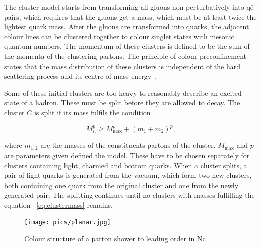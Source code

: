 The cluster model starts from transforming all gluons non-perturbatively into $\mathrm{q \bar q}$ pairs, which requires that the gluons get a mass, which must be at least twice the lightest quark mass. After the gluons are transformed into quarks, the adjacent colour lines can be clustered together to colour singlet states with mesonic quantum numbers. The momentum of these clusters is defined to be the sum of the momenta of the clustering partons. The principle of colour-preconfinement states that the mass distribution of these clusters is independent of the hard scattering process and its centre-of-mass energy~\cite{herwigManual}. %

Some of these initial clusters are too heavy to reasonably describe an excited state of a hadron. These must be
split before they are allowed to decay. The cluster $C$ is split if its mass fulfils the condition~\cite{herwigManual}

\begin{equation}
M_C^p \geq M_\mathrm{max}^p  + \left( m_1 + m_2\right)^p,
\label{eq:clustermass}
\end{equation}

\noindent where $m_{1,2}$ are the masses of the constituents partons of the cluster. $M_\mathrm{max}$ and $p$ are parameters given defined the model. These have to be chosen separately for clusters containing light, charmed and bottom quarks. When a cluster splits, a pair of light quarks is generated from the vacuum, which form two new clusters, both containing one quark from the original cluster and one from the newly generated pair. The splitting continues until no clusters with masses fulfilling the equation ~\ref{eq:clustermass} remains.

\begin{figure}
\centering
\texttt{[image: pics/planar.jpg]}
\caption[]{ Colour structure of a parton shower to leading order in Nc
\cite{eventGenerators} }
\label{fig:colourstructure}
\end{figure}

